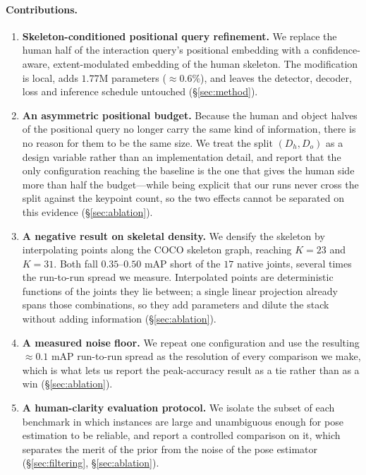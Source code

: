 \documentclass[12pt,a4paper]{article}
\begin{document}
\paragraph{Contributions.}
\begin{enumerate}\itemsep1pt\parskip0pt
\item \textbf{Skeleton-conditioned positional query refinement.} We replace the
human half of the interaction query's positional embedding with a
confidence-aware, extent-modulated embedding of the human skeleton. The
modification is local, adds $1.77$M parameters ($\approx 0.6\%$), and leaves
the detector, decoder, loss and inference schedule untouched
(\S\ref{sec:method}).
\item \textbf{An asymmetric positional budget.} Because the human and object
halves of the positional query no longer carry the same kind of information,
there is no reason for them to be the same size. We treat the split
$(D_h, D_o)$ as a design variable rather than an implementation detail, and
report that the only configuration reaching the baseline is the one that gives
the human side more than half the budget---while being explicit that our runs
never cross the split against the keypoint count, so the two effects cannot be
separated on this evidence (\S\ref{sec:ablation}).
\item \textbf{A negative result on skeletal density.} We densify the skeleton by
interpolating points along the COCO skeleton graph, reaching $K=23$ and $K=31$.
Both fall $0.35$--$0.50$ mAP short of the $17$ native joints, several times the
run-to-run spread we measure. Interpolated points are deterministic functions of
the joints they lie between; a single linear projection already spans those
combinations, so they add parameters and dilute the stack without adding
information (\S\ref{sec:ablation}).
\item \textbf{A measured noise floor.} We repeat one configuration and use the
resulting $\approx\!0.1$ mAP run-to-run spread as the resolution of every
comparison we make, which is what lets us report the peak-accuracy result as a
tie rather than as a win (\S\ref{sec:ablation}).
\item \textbf{A human-clarity evaluation protocol.} We isolate the subset of
each benchmark in which instances are large and unambiguous enough for pose
estimation to be reliable, and report a controlled comparison on it, which
separates the merit of the prior from the noise of the pose estimator
(\S\ref{sec:filtering}, \S\ref{sec:ablation}).
\end{enumerate}
\end{document}
